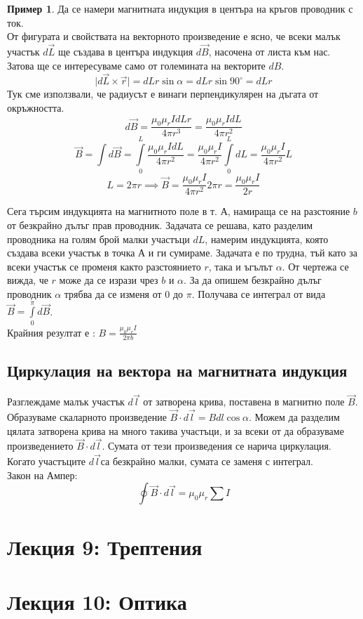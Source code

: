 \documentclass[fleqn, 12pt]{article}
\theoremstyle{definition}
\newtheorem{example}{Пример}[subsection]
\begin{document}
\begin{example}
Да се намери магнитната индукция в центъра на кръгов проводник с ток. \\
От фигурата и свойствата на векторното произведение е
ясно, че всеки малък участък $d\vec{L}$ ще създава в центъра
индукция $d\vec{B}$, насочена от листа към нас. \\
Затова ще се интересуваме само от големината на векторите $dB$.
$$\vert d\vec{L} \times \vec{r} \vert = dLr\sin\alpha = dLr\sin 90^{\circ} = dLr$$
Тук сме използвали, че радиусът е винаги перпендикулярен на дъгата от окръжността.
$$d\vec{B} = \frac{\mu_0 \mu_r IdLr}{4\pi r^3} = \frac{\mu_0 \mu_r IdL}{4\pi r^2}$$
$$\vec{B} = \int d\vec{B} = \int\limits_0 ^L  \frac{\mu_0 \mu_r IdL}{4\pi r^2} = 
\frac{\mu_0 \mu_r I}{4\pi r^2}  \int\limits_0 ^L dL = \frac{\mu_0 \mu_r I}{4\pi r^2} L $$
$$L = 2\pi r \implies \vec{B} = \frac{\mu_0 \mu_r I}{4\pi r^2} 2\pi r = \frac{\mu_0 \mu_r I}{2r}$$
\end{example}
Сега търсим индукцията на магнитното поле в т. А, намираща
се на разстояние $b$
от безкрайно дълъг прав проводник.
Задачата се решава, като разделим проводника на голям брой
малки участъци
$dL$, намерим индукцията, която създава всеки
участък в точка А и ги сумираме. Задачата е по трудна, тъй
като за всеки участък се променя както разстоянието
$r$, така и ъгълът $\alpha$.  От чертежа се вижда, че
$r$ може да се изрази чрез $b$ и $\alpha$.
 За да опишем безкрайно дълъг проводник $\alpha$ трябва да се изменя от 0 до $\pi$.
Получава се интеграл от вида $\vec{B} = \int\limits_0 ^{\pi} d\vec{B}$. \\
Крайния резултат е : $B = \frac{\mu_0 \mu_r I}{2\pi b}$

\subsection{Циркулация на вектора на магнитната индукция}
Разглеждаме малък участък $d\vec{l}$ от затворена крива,
поставена в магнитно поле $\vec{B}$. Образуваме скаларното
произведение $\vec{B} \cdot d\vec{l} = Bdl\cos\alpha$. Можем да разделим цялата
затворена крива на много такива участъци, и за всеки от да
образуваме произведението $\vec{B} \cdot d\vec{l}$. Сумата от тези произведения
се нарича циркулация. Когато участъците $d\vec{l}$са безкрайно
малки, сумата се заменя с интеграл. \\
Закон на Ампер:
$$\oint \vec{B} \cdot d\vec{l} = \mu_0 \mu_r \sum I$$
\subsection{}

\subsection{}


\newpage
\section{Лекция 9: Трептения}


\newpage
\section{ Лекция 10: Оптика}
\end{document}
